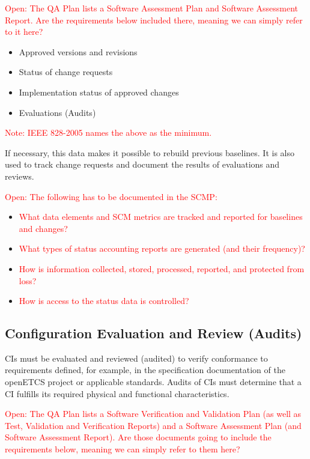 \documentclass{template/openetcs_article}
\begin{document}
\textcolor{red}{Open: The QA Plan lists a Software Assessment Plan and Software Assessment Report. Are the requirements below included there, meaning we can simply refer to it here?}

\vspace{-10pt}
\begin{itemize}
\item Approved versions and revisions
\item Status of change requests
\item Implementation status of approved changes
\item Evaluations (Audits)
\end{itemize}

\textcolor{red}{Note: IEEE 828-2005 names the above as the minimum.}

If necessary, this data makes it possible to rebuild previous baselines. It is also used to track change requests and document the results of evaluations and reviews.

\textcolor{red}{Open: The following has to be documented in the SCMP:}

\vspace{-10pt}
\begin{itemize}
\item \textcolor{red}{What data elements and SCM metrics are tracked and reported for baselines and
changes?}
\item \textcolor{red}{What types of status accounting reports are generated (and their frequency)?}
\item \textcolor{red}{How is information collected, stored, processed, reported, and protected from loss?}
\item \textcolor{red}{How is access to the status data is controlled?}
\end{itemize}


\subsection{Configuration Evaluation and Review (Audits)} %
\label{sec:Configuration Evaluation and Review (Audits)}

CIs must be evaluated and reviewed (audited) to verify conformance to requirements defined, for example, in the specification documentation of the openETCS project or applicable standards. Audits of CIs must determine that a CI fulfills its required physical and functional characteristics.

\textcolor{red}{Open: The QA Plan lists a Software Verification and Validation Plan (as well as Test, Validation and Verification Reports) and a Software Assessment Plan (and Software Assessment Report). Are those documents going to include the requirements below, meaning we can simply refer to them here?}
\end{document}
